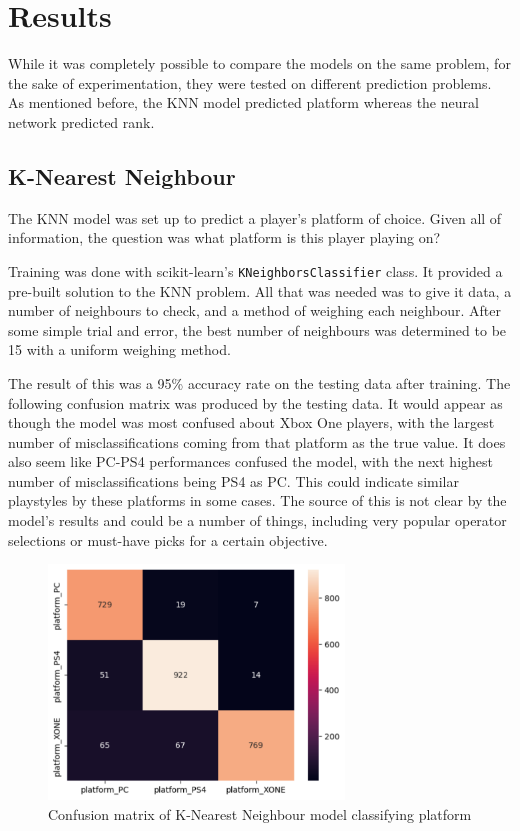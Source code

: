 \documentclass[12pt]{article}
\begin{document}
\section{Results}
While it was completely possible to compare the models on the same problem, for the sake of experimentation, they were tested on different prediction problems.
As mentioned before, the KNN model predicted platform whereas the neural network predicted rank.

\subsection{K-Nearest Neighbour}
The KNN model was set up to predict a player's platform of choice.
Given all of information, the question was what platform is this player playing on?

Training was done with scikit-learn's \verb`KNeighborsClassifier` class.
It provided a pre-built solution to the KNN problem.
All that was needed was to give it data, a number of neighbours to check, and a method of weighing each neighbour.
After some simple trial and error, the best number of neighbours was determined to be 15 with a uniform weighing method.

The result of this was a 95\% accuracy rate on the testing data after training.
The following confusion matrix was produced by the testing data.
It would appear as though the model was most confused about Xbox One players, with the largest number of misclassifications coming from that platform as the true value.
It does also seem like PC-PS4 performances confused the model, with the next highest number of misclassifications being PS4 as PC.
This could indicate similar playstyles by these platforms in some cases.
The source of this is not clear by the model's results and could be a number of things, including very popular operator selections or must-have picks for a certain objective.
\begin{figure}[H]
	\centering
	\includegraphics[width=0.7\textwidth]{knn-confusion-matrix}
	\caption{Confusion matrix of K-Nearest Neighbour model classifying platform}
	\label{fig:knn-confusion-matrix}
\end{figure}
\end{document}
